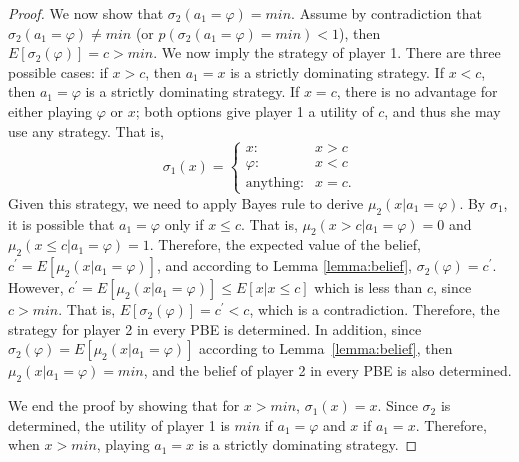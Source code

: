 \documentclass[letterpaper]{article} %
\begin{document}
\begin{proof}
We now show that $\sigma_2(a_1=\varphi) = min$.
Assume by contradiction that $\sigma_2(a_1=\varphi)\neq min$ (or $p(\sigma_2(a_1=\varphi)=min) < 1$), then $E[\sigma_2(\varphi)]=c>min$.
We now imply the strategy of player 1. There are three possible cases: if $x>c$, then $a_1=x$ is a strictly dominating strategy. If $x < c$, then $a_1=\varphi$ is a strictly dominating strategy.
If $x=c$, there is no advantage for either playing $\varphi$ or $x$; both options give player 1 a utility of $c$, and thus she may use any strategy.
That is,
$$\sigma_1(x)=\begin{cases}x: & x>c \\ \varphi: & x<c \\ \text{anything}: & x=c.\end{cases}$$
%
Given this strategy, we need to apply Bayes rule to derive $\mu_2(x| a_1=\varphi)$. By $\sigma_1$, it is possible that $a_1=\varphi$ only if $x\leq c$. That is, $\mu_2(x>c| a_1=\varphi)=0$ and $\mu_2(x \leq c| a_1=\varphi)=1$. Therefore, the expected value of the belief, $c^\prime = E[\mu_2(x|a_1=\varphi)]$, and according to Lemma \ref{lemma:belief}, $\sigma_2(\varphi) = c^\prime$. However, $c^\prime = E[\mu_2(x|a_1=\varphi)] \leq E[x | x\leq c]$ which is less than $c$, since $c>min$. That is,
$E[\sigma_2(\varphi)]=c^\prime < c$, which is a contradiction.
%
Therefore, the strategy for player 2 in every PBE is determined. In addition, since $\sigma_2(\varphi) = E[\mu_2(x| a_1=\varphi)]$ according to Lemma~\ref{lemma:belief}, then $\mu_2(x| a_1=\varphi)=min$, and the belief of player 2 in every PBE is also determined.

We end the proof by showing that for $x>min$, $\sigma_1(x)=x$. Since $\sigma_2$ is determined, the utility of player 1 is $min$ if $a_1=\varphi$ and $x$ if $a_1=x$. Therefore, when $x>min$, playing $a_1=x$ is a strictly dominating strategy.


\end{proof}
\end{document}
